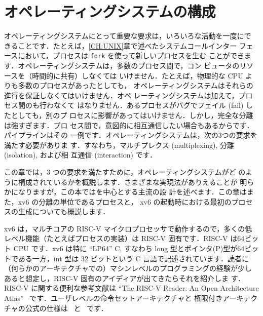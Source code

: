 
\chapter{オペレーティングシステムの構成}
\label{CH:FIRST}

オペレーティングシステムにとって重要な要求は，いろいろな活動を一度にで
きることです．たとえば，\ref{CH:UNIX}章で述べたシステムコールインター
フェースにおいて，プロセスは \lstinline{fork} を使って新しいプロセスを生む
ことができます．オペレーティングシステムは，多数のプロセス間で，コン
ピュータのリソースを（時間的に共有）しなくては
いけません．たとえば，物理的な CPU よりも多数のプロセスがあったとしても，
オペレーティングシステムはそれらの進行を保証しなくてはいけません．オペ
レーティングシステムは加えて，プロセス間のも行わなくて
はなりません．あるプロセスがバグでフェイル (fail) したとしても，別のプ
ロセスに影響があってはいけません．しかし，完全な分離は強すぎます．プロ
セス間で，意図的に相互通信したい場合もあるからです．パイプラインはその
一例です．オペレーティングシステムは，次の3つの要求を満たす必要がありま
す．すなわち，マルチプレクス (multiplexing), 分離 (isolation), および相
互通信 (interaction) です．

この章では，3 つの要求を満たすために，オペレーティングシステムがど
のように構成されているかを概説します．さまざまな実現法がありえることが
明らかになりますが，この本ではを中心とする主流の設
計を述べます．この章はまた，xv6 の分離の単位であるプロセスと，
xv6 の起動時における最初のプロセスの生成についても概説します．

xv6 は，マルチコアの RISC-V マイクロプロセッサで動作するので，多くの低
レベル機能（たとえばプロセスの実装）は RISC-V 固有です．RISC-V は64ビッ
ト CPU です．xv6 は特に “LP64” C, すなわち long 型とポインタ(P)型が64ビッ
トである一方，int 型は 32 ビットという C 言語で記述されています．読者に
（何らかのアーキテクチャでの）マシンレベルのプログラミングの経験が少し
あると想定し，RISC-V 固有のアイディアが出てきたらそれを紹介しま
す．RISC-V に関する便利な参考文献は “The RISC-V Reader: An Open
Architecture Atlas”~\cite{riscv} です．ユーザレベルの命令セットアーキテクチャと
権限付きアーキテクチャの公式の仕様は~\cite{riscv:user} と~\cite{riscv:priv} です．

